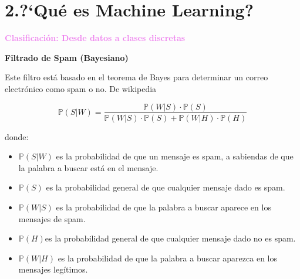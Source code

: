 \documentclass[11pt]{beamer}
\begin{document}
\section{2.?`Qu\'e es Machine Learning? }

 \begin{frame}{\textbf{\textcolor{violet}{Clasificaci\'on: Desde datos a clases discretas}} }
 	


\vspace{0.2cm}

\textbf{Filtrado de Spam (Bayesiano)}

\scriptsize{Este filtro est\'a basado en el teorema de Bayes para determinar un correo electr\'onico como spam o no. De wikipedia
	
	
\[
\mathbb{P}(S|W) = \frac{\mathbb{P}(W|S)\cdot\mathbb{P}(S)}{\mathbb{P}(W|S)\cdot \mathbb{P}(S) + \mathbb{P}(W|H)\cdot \mathbb{P}(H) }
\]

donde:


\begin{itemize}
\item $\mathbb{P}(S|W)$ es la probabilidad de que un mensaje es spam, a sabiendas de que la palabra a buscar est\'a en el mensaje.
\item $\mathbb{P}(S)$ es la probabilidad general de que cualquier mensaje dado es spam.
\item $\mathbb{P}(W|S)$ es la probabilidad de que la palabra a buscar aparece en los mensajes de spam.
\item $\mathbb{P}(H)$es la probabilidad general de que cualquier mensaje dado no es spam.
\item  $\mathbb{P}(W|H)$ es la probabilidad de que la palabra a buscar  aparezca en los mensajes leg\'itimos.
\end{itemize}
}


\end{frame}
\end{document}
